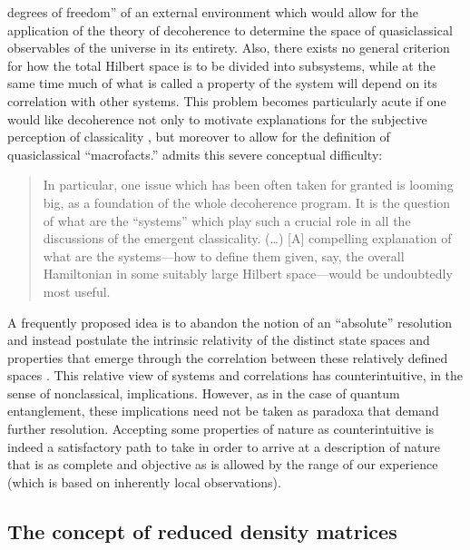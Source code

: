 \documentclass[twocolumn,rmp,aps,amsmath,amsfonts,noshowkeys,noshowpacs]{revtex4}
\begin{document}
degrees of freedom'' of an external environment which would allow for
the application of the theory of decoherence to determine the space of
quasiclassical observables of the universe in its entirety.  Also,
there exists no general criterion for how the total Hilbert space is
to be divided into subsystems, while at the same time much of what is
called a property of the system will depend on its correlation with
other systems. This problem becomes particularly acute if one would
like decoherence not only to motivate explanations for the subjective
perception of classicality \citep[as in Zurek's ``existential
interpretation,'' see][and Sec.~\ref{sec:everett}
below]{Zurek:1993:pu,Zurek:1998:re,Zurek:2002:ii}, but moreover to
allow for the definition of quasiclassical ``macrofacts.''
\citet[p.~1820]{Zurek:1998:re} admits this severe conceptual
difficulty:
%
\begin{quote} {\small
    In particular, one issue which has been often taken for granted is
    looming big, as a foundation of the whole decoherence program. It
    is the question of what are the ``systems'' which play such a
    crucial role in all the discussions of the emergent classicality.
    (\dots) [A] compelling explanation of what are the
    systems---how to define them given, say, the overall Hamiltonian
    in some suitably large Hilbert space---would be undoubtedly most
    useful.}
\end{quote}
%
A frequently proposed idea is to abandon the notion of an ``absolute''
resolution and instead postulate the intrinsic relativity of the
distinct state spaces and properties that emerge through the
correlation between these relatively defined spaces \citetext{see, for
  example, the proposals, unrelated to decoherence, of
  \citealp{Everett:1957:rw,Mermin:1998:ii,Mermin:1998:wi}; and
  \citealp{Rovelli:1996:rq}}.  This relative view of systems and
correlations has counterintuitive, in the sense of nonclassical,
implications. However, as in the case of quantum entanglement, these
implications need not be taken as paradoxa that demand further
resolution.  Accepting some properties of nature as counterintuitive
is indeed a satisfactory path to take in order to arrive at a
description of nature that is as complete and objective as is allowed
by the range of our experience (which is based on inherently local
observations).


\subsection{The concept of reduced density matrices \label{sec:redmat}}
\end{document}
